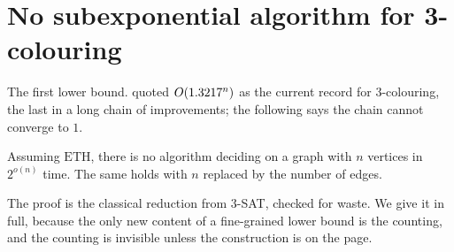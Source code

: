 \section{No subexponential algorithm for 3-colouring}
\label{sec:eth-3col}

The first lower bound.  quoted $O\!\left(1.3217^n\right)$ as the
current record for $3$-colouring, the last in a long chain of improvements; the following says
the chain cannot converge to $1$.

\begin{theorem}\label{thm:eth-3col}
Assuming $\mathrm{ETH}$, there is no algorithm deciding  on a
graph with $n$ vertices in $2^{o(n)}$ time. The same holds with $n$ replaced by
the number of edges.
\end{theorem}

The proof is the classical reduction from $3$-SAT, checked for waste. We give
it in full, because the only new content of a fine-grained lower bound is the
counting, and the counting is invisible unless the construction is on the page.


